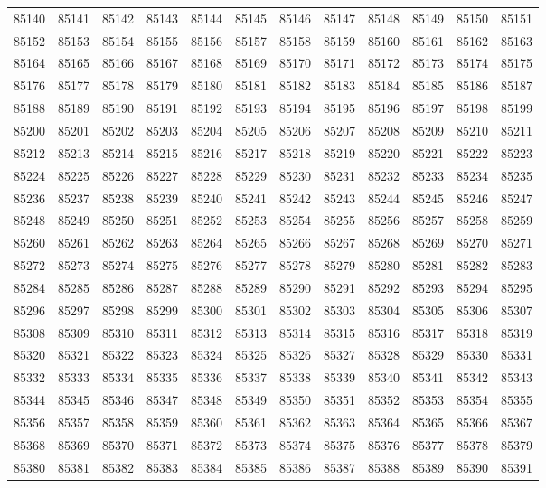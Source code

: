 \begin{center}
\begin{longtable}{llllllllllll}
85140 &85141 &85142 &85143 &85144 &85145 &85146 &85147 &85148 &85149 &85150 &85151 \\
85152 &85153 &85154 &85155 &85156 &85157 &85158 &85159 &85160 &85161 &85162 &85163 \\
85164 &85165 &85166 &85167 &85168 &85169 &85170 &85171 &85172 &85173 &85174 &85175 \\
85176 &85177 &85178 &85179 &85180 &85181 &85182 &85183 &85184 &85185 &85186 &85187 \\
85188 &85189 &85190 &85191 &85192 &85193 &85194 &85195 &85196 &85197 &85198 &85199 \\
85200 &85201 &85202 &85203 &85204 &85205 &85206 &85207 &85208 &85209 &85210 &85211 \\
85212 &85213 &85214 &85215 &85216 &85217 &85218 &85219 &85220 &85221 &85222 &85223 \\
85224 &85225 &85226 &85227 &85228 &85229 &85230 &85231 &85232 &85233 &85234 &85235 \\
85236 &85237 &85238 &85239 &85240 &85241 &85242 &85243 &85244 &85245 &85246 &85247 \\
85248 &85249 &85250 &85251 &85252 &85253 &85254 &85255 &85256 &85257 &85258 &85259 \\
85260 &85261 &85262 &85263 &85264 &85265 &85266 &85267 &85268 &85269 &85270 &85271 \\
85272 &85273 &85274 &85275 &85276 &85277 &85278 &85279 &85280 &85281 &85282 &85283 \\
85284 &85285 &85286 &85287 &85288 &85289 &85290 &85291 &85292 &85293 &85294 &85295 \\
85296 &85297 &85298 &85299 &85300 &85301 &85302 &85303 &85304 &85305 &85306 &85307 \\
85308 &85309 &85310 &85311 &85312 &85313 &85314 &85315 &85316 &85317 &85318 &85319 \\
85320 &85321 &85322 &85323 &85324 &85325 &85326 &85327 &85328 &85329 &85330 &85331 \\
85332 &85333 &85334 &85335 &85336 &85337 &85338 &85339 &85340 &85341 &85342 &85343 \\
85344 &85345 &85346 &85347 &85348 &85349 &85350 &85351 &85352 &85353 &85354 &85355 \\
85356 &85357 &85358 &85359 &85360 &85361 &85362 &85363 &85364 &85365 &85366 &85367 \\
85368 &85369 &85370 &85371 &85372 &85373 &85374 &85375 &85376 &85377 &85378 &85379 \\
85380 &85381 &85382 &85383 &85384 &85385 &85386 &85387 &85388 &85389 &85390 &85391 \\

\end{longtable}
\end{center}

